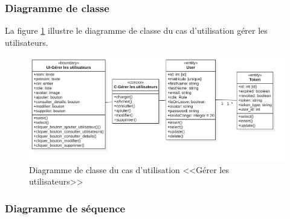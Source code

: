\subsubsection{Diagramme de classe}
La figure \ref{fig:cgu} illustre le diagramme de classe du cas d’utilisation gérer les utilisateurs.
\begin{figure}[h]
     \centering
   \includegraphics[width=16cm]{images/C-gus.jpg}
     \caption{Diagramme de classe du cas d'utilisation <<Gérer les utilisateurs>>}
     \label{fig:cgu}
 \end{figure}
 \subsubsection{Diagramme de séquence}

